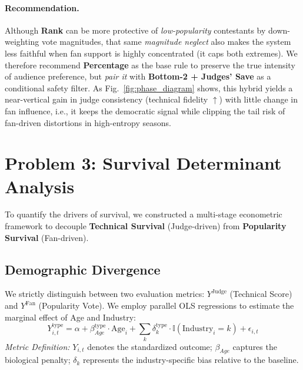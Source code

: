 \documentclass[12pt]{article}
\begin{document}
\paragraph{Recommendation.} Although \textbf{Rank} can be more protective of \emph{low-popularity} contestants by down-weighting vote magnitudes, that same \emph{magnitude neglect} also makes the system less faithful when fan support is highly concentrated (it caps both extremes). We therefore recommend \textbf{Percentage} as the base rule to preserve the true intensity of audience preference, but \emph{pair it} with \textbf{Bottom-2 + Judges' Save} as a conditional safety filter. As Fig.~\ref{fig:phase_diagram} shows, this hybrid yields a near-vertical gain in judge consistency (technical fidelity $\uparrow$) with little change in fan influence, i.e., it keeps the democratic signal while clipping the tail risk of fan-driven distortions in high-entropy seasons.









\section{Problem 3: Survival Determinant Analysis}

To quantify the drivers of survival, we constructed a multi-stage econometric framework to decouple \textbf{Technical Survival} (Judge-driven) from \textbf{Popularity Survival} (Fan-driven).

\subsection{Demographic Divergence}

We strictly distinguish between two evaluation metrics: $Y^{\text{Judge}}$ (Technical Score) and $Y^{\text{Fan}}$ (Popularity Vote). We employ parallel OLS regressions to estimate the marginal effect of Age and Industry:
\begin{equation} \label{eq:demo_model}
	Y_{i,t}^{\text{type}} = \alpha + \beta_{Age}^{\text{type}} \cdot \text{Age}_i + \sum_{k} \delta_{k}^{\text{type}} \cdot \mathbb{I}(\text{Industry}_i = k) + \epsilon_{i,t}
\end{equation}
\noindent \textit{Metric Definition:} $Y_{i,t}$ denotes the standardized outcome; $\beta_{Age}$ captures the biological penalty; $\delta_{k}$ represents the industry-specific bias relative to the baseline.
\end{document}
